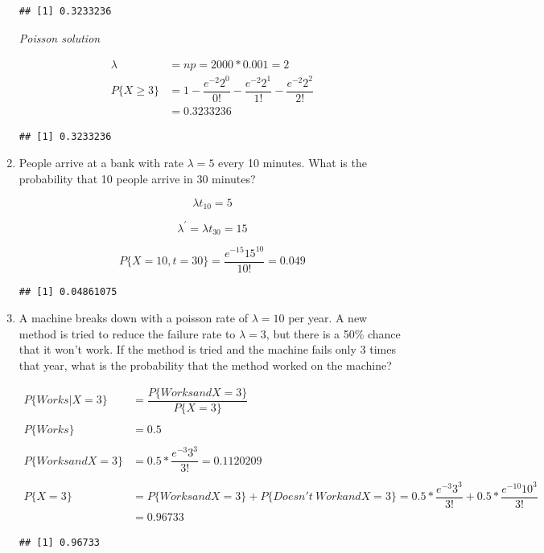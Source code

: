 \documentclass[]{book}
\theoremstyle{definition}
\theoremstyle{definition}
\theoremstyle{definition}
\theoremstyle{remark}
\begin{document}
\begin{enumerate}
\begin{verbatim}
## [1] 0.3233236
\end{verbatim}

  \emph{Poisson solution}

  \begin{align*}
   \lambda &= np = 2000*0.001 = 2 \\
   P\{X \ge 3\} &= 1 - \dfrac{e^{-2}2^0}{0!} - \dfrac{e^{-2}2^1}{1!} - \dfrac{e^{-2}2^2}{2!} \\
       &= 0.3233236
   \end{align*}

\begin{verbatim}
## [1] 0.3233236
\end{verbatim}
\item
  People arrive at a bank with rate \(\lambda = 5\) every 10 minutes.
  What is the probability that 10 people arrive in 30 minutes?

  \[\lambda t_{10} = 5\]

  \[\lambda^\prime = \lambda t_{30} = 15 \]

  \[P\{X = 10, t=30\} = \dfrac{e^{-15}15^{10}}{10!} =  0.049\]

\begin{verbatim}
## [1] 0.04861075
\end{verbatim}
\item
  A machine breaks down with a poisson rate of \(\lambda = 10\) per
  year. A new method is tried to reduce the failure rate to
  \(\lambda = 3\), but there is a 50\% chance that it won't work. If the
  method is tried and the machine fails only 3 times that year, what is
  the probability that the method worked on the machine?

  \begin{align*}
   P\{Works | X = 3\}  &= \dfrac{P\{Works and X = 3\}}{P\{X = 3\}} \\~\\
   P\{Works\} &= 0.5\\~\\
   P\{Works and X = 3\} &= 0.5 * \dfrac{e^{-3}3^3}{3!} = 0.1120209\\~\\
   P\{X = 3\} &= P\{Works and X = 3\} + P\{Doesn't\ Work and X = 3\} = 0.5 * \dfrac{e^{-3}3^3}{3!} + 0.5 * \dfrac{e^{-10}10^3}{3!} \\
   &= 0.96733
   \end{align*}

\begin{verbatim}
## [1] 0.96733
\end{verbatim}
\end{enumerate}
\end{document}
